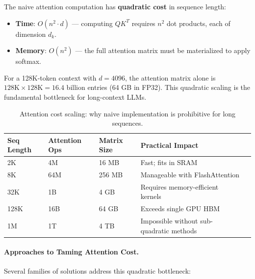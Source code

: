 The naive attention computation has \textbf{quadratic cost} in sequence length:

\begin{itemize}
  \item \textbf{Time}: $O(n^2 \cdot d)$ --- computing $QK^T$ requires $n^2$ dot products, each of dimension $d_k$.
  \item \textbf{Memory}: $O(n^2)$ --- the full attention matrix must be materialized to apply softmax.
\end{itemize}

For a 128K-token context with $d = 4096$, the attention matrix alone is $128\text{K} \times 128\text{K} = 16.4$ billion entries (64 GB in FP32). This quadratic scaling is the fundamental bottleneck for long-context LLMs.

\vspace{6pt}
\begin{table}[ht!]
\centering
\caption{Attention cost scaling: why naive implementation is prohibitive for long sequences.}
\begin{tabular}{@{}lllll@{}}
\toprule
\textbf{Seq Length} & \textbf{Attention Ops} & \textbf{Matrix Size} & \textbf{Practical Impact} \\
\midrule
2K & 4M & 16 MB & Fast; fits in SRAM \\
8K & 64M & 256 MB & Manageable with FlashAttention \\
32K & 1B & 4 GB & Requires memory-efficient kernels \\
128K & 16B & 64 GB & Exceeds single GPU HBM \\
1M & 1T & 4 TB & Impossible without sub-quadratic methods \\
\bottomrule
\end{tabular}
\end{table}

\paragraph{Approaches to Taming Attention Cost.}
\label{approaches-to-taming-attention-cost.}

Several families of solutions address this quadratic bottleneck:

